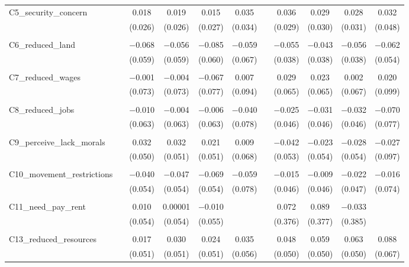 \begin{table}[H]
\begin{tabular}{@{\extracolsep{4pt}}lcccccccccc}
 C5\_security\_concern &  & 0.018 & 0.019 & 0.015 & 0.035 &  & 0.036 & 0.029 & 0.028 & 0.032 \\ 
  &  & (0.026) & (0.026) & (0.027) & (0.034) &  & (0.029) & (0.030) & (0.031) & (0.048) \\ 
  & & & & & & & & & & \\ 
 C6\_reduced\_land &  & $-$0.068 & $-$0.056 & $-$0.085 & $-$0.059 &  & $-$0.055 & $-$0.043 & $-$0.056 & $-$0.062 \\ 
  &  & (0.059) & (0.059) & (0.060) & (0.067) &  & (0.038) & (0.038) & (0.038) & (0.054) \\ 
  & & & & & & & & & & \\ 
 C7\_reduced\_wages &  & $-$0.001 & $-$0.004 & $-$0.067 & 0.007 &  & 0.029 & 0.023 & 0.002 & 0.020 \\ 
  &  & (0.073) & (0.073) & (0.077) & (0.094) &  & (0.065) & (0.065) & (0.067) & (0.099) \\ 
  & & & & & & & & & & \\ 
 C8\_reduced\_jobs &  & $-$0.010 & $-$0.004 & $-$0.006 & $-$0.040 &  & $-$0.025 & $-$0.031 & $-$0.032 & $-$0.070 \\ 
  &  & (0.063) & (0.063) & (0.063) & (0.078) &  & (0.046) & (0.046) & (0.046) & (0.077) \\ 
  & & & & & & & & & & \\ 
 C9\_perceive\_lack\_morals &  & 0.032 & 0.032 & 0.021 & 0.009 &  & $-$0.042 & $-$0.023 & $-$0.028 & $-$0.027 \\ 
  &  & (0.050) & (0.051) & (0.051) & (0.068) &  & (0.053) & (0.054) & (0.054) & (0.097) \\ 
  & & & & & & & & & & \\ 
 C10\_movement\_restrictions &  & $-$0.040 & $-$0.047 & $-$0.069 & $-$0.059 &  & $-$0.015 & $-$0.009 & $-$0.022 & $-$0.016 \\ 
  &  & (0.054) & (0.054) & (0.054) & (0.078) &  & (0.046) & (0.046) & (0.047) & (0.074) \\ 
  & & & & & & & & & & \\ 
 C11\_need\_pay\_rent &  & 0.010 & 0.00001 & $-$0.010 &  &  & 0.072 & 0.089 & $-$0.033 &  \\ 
  &  & (0.054) & (0.054) & (0.055) &  &  & (0.376) & (0.377) & (0.385) &  \\ 
  & & & & & & & & & & \\ 
 C13\_reduced\_resources &  & 0.017 & 0.030 & 0.024 & 0.035 &  & 0.048 & 0.059 & 0.063 & 0.088 \\ 
  &  & (0.051) & (0.051) & (0.051) & (0.056) &  & (0.050) & (0.050) & (0.050) & (0.067) \\ 

\end{tabular}
\end{table}
